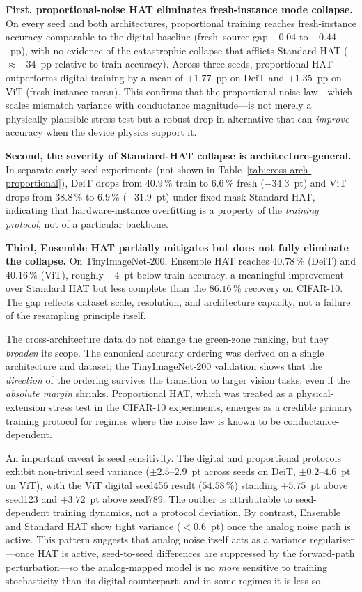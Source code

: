 \textbf{First, proportional-noise HAT eliminates fresh-instance mode collapse.}  On every seed and both architectures, proportional training reaches fresh-instance accuracy comparable to the digital baseline (fresh--source gap $-0.04$ to $-0.44$~pp), with no evidence of the catastrophic collapse that afflicts Standard HAT ($\approx -34$~pp relative to train accuracy).  Across three seeds, proportional HAT outperforms digital training by a mean of $+1.77$~pp on DeiT and $+1.35$~pp on ViT (fresh-instance mean).  This confirms that the proportional noise law---which scales mismatch variance with conductance magnitude---is not merely a physically plausible stress test but a robust drop-in alternative that can \emph{improve} accuracy when the device physics support it.

\textbf{Second, the severity of Standard-HAT collapse is architecture-general.}  In separate early-seed experiments (not shown in Table~\ref{tab:cross-arch-proportional}), DeiT drops from $40.9\,\%$ train to $6.6\,\%$ fresh ($-34.3$~pt) and ViT drops from $38.8\,\%$ to $6.9\,\%$ ($-31.9$~pt) under fixed-mask Standard HAT, indicating that hardware-instance overfitting is a property of the \emph{training protocol}, not of a particular backbone.

\textbf{Third, Ensemble HAT partially mitigates but does not fully eliminate the collapse.}  On TinyImageNet-200, Ensemble HAT reaches $40.78\,\%$ (DeiT) and $40.16\,\%$ (ViT), roughly $-4$~pt below train accuracy, a meaningful improvement over Standard HAT but less complete than the $86.16\,\%$ recovery on CIFAR-10.  The gap reflects dataset scale, resolution, and architecture capacity, not a failure of the resampling principle itself.

The cross-architecture data do not change the green-zone ranking, but they \emph{broaden} its scope.  The canonical accuracy ordering was derived on a single architecture and dataset; the TinyImageNet-200 validation shows that the \emph{direction} of the ordering survives the transition to larger vision tasks, even if the \emph{absolute margin} shrinks.  Proportional HAT, which was treated as a physical-extension stress test in the CIFAR-10 experiments, emerges as a credible primary training protocol for regimes where the noise law is known to be conductance-dependent.

An important caveat is seed sensitivity.  The digital and proportional protocols exhibit non-trivial seed variance ($\pm 2.5$--$2.9$~pt across seeds on DeiT, $\pm 0.2$--$4.6$~pt on ViT), with the ViT digital seed456 result ($54.58\,\%$) standing $+5.75$~pt above seed123 and $+3.72$~pt above seed789.  The outlier is attributable to seed-dependent training dynamics, not a protocol deviation.  By contrast, Ensemble and Standard HAT show tight variance ($<0.6$~pt) once the analog noise path is active.  This pattern suggests that analog noise itself acts as a variance regulariser---once HAT is active, seed-to-seed differences are suppressed by the forward-path perturbation---so the analog-mapped model is no \emph{more} sensitive to training stochasticity than its digital counterpart, and in some regimes it is less so.

